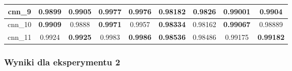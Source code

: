 \begin{table}[p]
\begin{tabular} {|c|c|c|c|c|c|c|c|c| }
        cnn\_9   & 0.9899                              & \textbf{0.9905}                     & \textbf{0.9977}             & 0.9976                              & 0.98182                     & \textbf{0.9826}                      & 0.99001                              & \textbf{0.9904}             \\ \hline
        cnn\_10  & \textbf{0.9909}                     & 0.9888                              & \textbf{0.9971}             & 0.9957                              & \textbf{0.98334}            & 0.98162                              & \textbf{0.99067}                     & 0.98889                     \\ \hline
        cnn\_11  & 0.9924                              & \textbf{0.9925}                     & 0.9983                      & \textbf{0.9986}                     & \textbf{0.98536}            & 0.98486                              & 0.99175                              & \textbf{0.99182}            \\ \hline
    \end{tabular}
\end{table}


\newpage %
\subsubsection{\label{wyniki_eksperymentow_eks_2}Wyniki dla eksperymentu 2}




